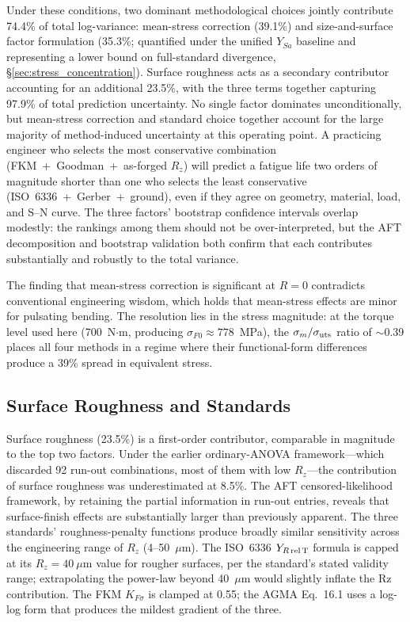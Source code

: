 \documentclass[12pt,a4paper]{article}
\begin{document}
Under these conditions, two dominant methodological choices jointly
contribute 74.4\% of total log-variance: mean-stress correction
(39.1\%) and size-and-surface factor formulation (35.3\%;
quantified under the unified $Y_{Sa}$ baseline and representing a
lower bound on full-standard divergence,
\S\ref{sec:stress_concentration}). Surface roughness acts as a
secondary contributor accounting for an additional 23.5\%, with the
three terms together capturing 97.9\% of total prediction
uncertainty. No single factor dominates unconditionally, but
mean-stress correction and standard choice together account for
the large majority of method-induced uncertainty at this operating
point. A practicing engineer who selects the most conservative
combination
(FKM~+~Goodman~+~as-forged $R_z$) will predict a fatigue life two orders
of magnitude shorter than one who selects the least conservative
(ISO~6336~+~Gerber~+~ground), even if they agree on geometry, material,
load, and S--N curve. The three factors' bootstrap confidence intervals
overlap modestly: the rankings among them should not be over-interpreted,
but the AFT decomposition and bootstrap validation both confirm that each
contributes substantially and robustly to the total variance.

The finding that mean-stress correction is significant at $R=0$
contradicts conventional engineering wisdom, which holds that
mean-stress effects are minor for pulsating bending. The resolution lies
in the stress magnitude: at the torque level used here (700~N$\cdot$m,
producing $\sigma_{F0} \approx 778$~MPa), the $\sigma_m/\sigma_{\rm uts}$
ratio of $\sim$0.39 places all four methods in a regime where their
functional-form differences produce a 39\% spread in equivalent stress.

\subsection{Surface Roughness and Standards}

Surface roughness (23.5\%) is a first-order contributor, comparable in
magnitude to the top two factors. Under the earlier ordinary-ANOVA
framework---which discarded 92 run-out combinations, most of them with
low $R_z$---the contribution of surface roughness was underestimated at
8.5\%. The AFT censored-likelihood framework, by retaining the partial
information in run-out entries, reveals that surface-finish effects are
substantially larger than previously apparent. The three standards'
roughness-penalty functions produce broadly similar sensitivity across
the engineering range of $R_z$ (4--50~$\mu$m). The ISO~6336
$Y_{R\,\rm rel\,T}$ formula is capped at its $R_z=40~\mu$m value for
rougher surfaces, per the standard's stated validity range; extrapolating
the power-law beyond 40~$\mu$m would slightly inflate the Rz contribution.
The FKM $K_{F\sigma}$ is clamped at 0.55; the AGMA Eq.~16.1 uses a
log-log form that produces the mildest gradient of the three.
\end{document}
